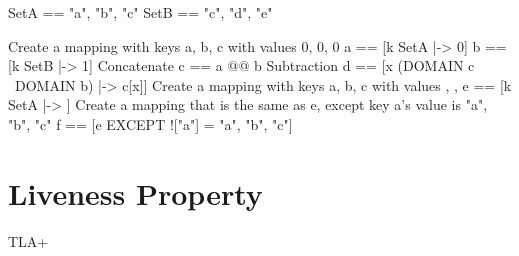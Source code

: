 \begin{tla}
SetA == {"a", "b", "c"}
SetB == {"c", "d", "e"}

\* Create a mapping with keys a, b, c with values 0, 0, 0
a == [k \in SetA |-> 0]
b == [k \in SetB |-> 1]
\* Concatenate 
c == a @@ b
\* Subtraction
d == [x \in (DOMAIN c \ DOMAIN b) |-> c[x]]
\* Create a mapping with keys a, b, c with values {}, {}, {}
e == [k \in SetA |-> {}]
\* Create a mapping that is the same as e, except key a's value is {"a", "b", "c"}
f == [e EXCEPT !["a"] = {"a", "b", "c"}] 

\end{tla}
\begin{tlatex}
%
%
\@pvspace{8.0pt}%
\@x{}%
%
\@xx{}%
%
%
\@x{}%
%
\@xx{}%
%
\@x{}%
%
\@xx{}%
\@x{}%
%
\@xx{}%
%
\@x{}%
%
\@xx{}%
\@pvspace{8.0pt}%
\end{tlatex}

\section{Liveness Property}


TLA+ 



